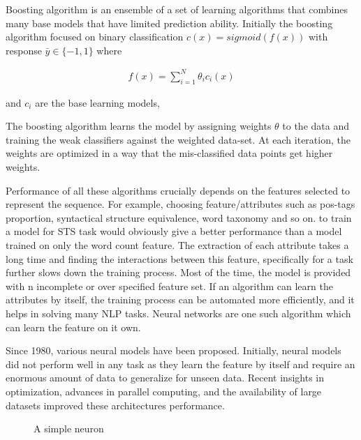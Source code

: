 \documentclass[12pt]{report} %
\begin{document}
Boosting algorithm is an ensemble of a set of learning algorithms that combines many base models that have limited prediction ability. Initially the boosting algorithm focused on binary classification $c(x)= sigmoid(f(x))$ with response $\bar{y} \in \{-1,1\} $ where  

\begin{align}
f(x) =     \sum_{i=1}^{N} \theta_{i} c_{i}(x)
\end{align}

and $c_{i}$ are the base learning models,

The boosting algorithm learns the model by assigning weights $\theta$ to the data and training the weak classifiers against the weighted data-set. At each iteration, the weights are optimized in a way that the mis-classified data points get higher weights.

Performance of all these algorithms crucially depends on the features selected to represent the sequence. For example, choosing feature/attributes such as pos-tags proportion, syntactical structure equivalence, word taxonomy and so on. to train a model for STS task would obviously give a better performance than a model trained on only the word count feature. The extraction of each attribute takes a long time and finding the interactions between this feature, specifically for a task further slows down the training process. Most of the time, the model is provided with n incomplete or over specified feature set. If an algorithm can learn the attributes by itself, the training process can be automated more efficiently, and it helps in solving many NLP tasks. Neural networks are one such algorithm which can learn the feature on it own.

Since 1980, various neural models have been proposed. Initially, neural models did not perform well in any task as they learn the feature by itself and require an enormous amount of data to generalize for unseen data. Recent insights in optimization, advances in parallel computing, and the availability of large datasets improved these architectures performance. 

\begin{figure}[!htb]
	\centering
	\caption{A simple neuron}
	\label{neuron}
\end{figure}
\end{document}

